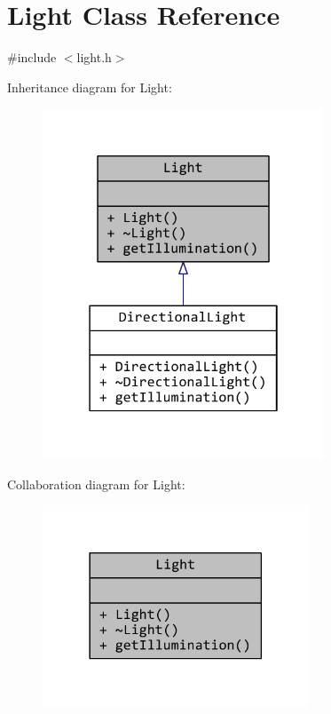 \hypertarget{classLight}{\section{Light Class Reference}
\label{classLight}
}


{\ttfamily \#include $<$light.\+h$>$}



Inheritance diagram for Light\+:
\nopagebreak
\begin{figure}[H]
\begin{center}
\leavevmode
\includegraphics[width=238pt]{classLight__inherit__graph}
\end{center}
\end{figure}


Collaboration diagram for Light\+:
\nopagebreak
\begin{figure}[H]
\begin{center}
\leavevmode
\includegraphics[width=225pt]{classLight__coll__graph}
\end{center}
\end{figure}
